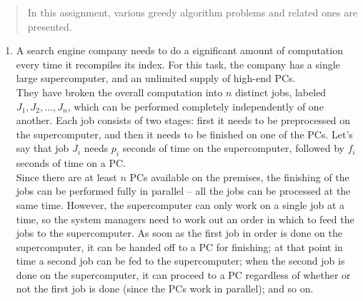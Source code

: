 \documentclass[11pts]{article}
\begin{document}
\maketitle

\begin{abstract}
In this assignment, various greedy algorithm problems and related ones are
presented.
\end{abstract}
\newpage

\begin{enumerate}
\item A search engine company needs to do a significant amount of
computation every time it recompiles its index. For this task, the
company has a single large supercomputer, and an unlimited supply
of high-end PCs. \\
 
They have broken the overall computation into $n$ distinct jobs,
labeled $J_1, J_2, \dots, J_n$, which can be performed completely
independently of one another. Each job consists of two stages: first
it needs to be preprocessed on the supercomputer, and then it needs to 
be finished on one of the PCs. Let’s say that job $J_i$ needs $p_i$
seconds of time on the supercomputer, followed by $f_i$ seconds of
time on a PC. \\

Since there are at least $n$ PCs available on the
premises, the finishing of the jobs can be performed fully in
parallel – all the jobs can be processed at the same time. 
However, the supercomputer can only work on a single job at a
time, so the system managers need to work out an order in which to
feed the jobs to the supercomputer. As soon as the first job in
order is done on the supercomputer, it can be handed off to a PC for 
finishing; at that point in time a second job can be fed to the
supercomputer; when the second job is done on the supercomputer, it
can proceed to a PC regardless of whether or not the first job is done
(since the PCs work in parallel); and so on. \\


\end{enumerate}
\end{document}
